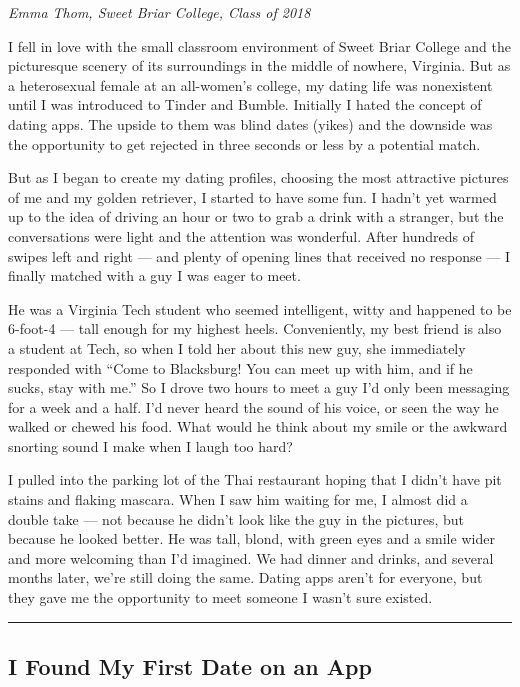 \emph{Emma Thom, Sweet Briar College, Class of 2018}

I fell in love with the small classroom environment of Sweet Briar
College and the picturesque scenery of its surroundings in the middle of
nowhere, Virginia. But as a heterosexual female at an all-women's
college, my dating life was nonexistent until I was introduced to Tinder
and Bumble. Initially I hated the concept of dating apps. The upside to
them was blind dates (yikes) and the downside was the opportunity to get
rejected in three seconds or less by a potential match.

But as I began to create my dating profiles, choosing the most
attractive pictures of me and my golden retriever, I started to have
some fun. I hadn't yet warmed up to the idea of driving an hour or two
to grab a drink with a stranger, but the conversations were light and
the attention was wonderful. After hundreds of swipes left and right ---
and plenty of opening lines that received no response --- I finally
matched with a guy I was eager to meet.

He was a Virginia Tech student who seemed intelligent, witty and
happened to be 6-foot-4 --- tall enough for my highest heels.
Conveniently, my best friend is also a student at Tech, so when I told
her about this new guy, she immediately responded with ``Come to
Blacksburg! You can meet up with him, and if he sucks, stay with me.''
So I drove two hours to meet a guy I'd only been messaging for a week
and a half. I'd never heard the sound of his voice, or seen the way he
walked or chewed his food. What would he think about my smile or the
awkward snorting sound I make when I laugh too hard?

I pulled into the parking lot of the Thai restaurant hoping that I
didn't have pit stains and flaking mascara. When I saw him waiting for
me, I almost did a double take --- not because he didn't look like the
guy in the pictures, but because he looked better. He was tall, blond,
with green eyes and a smile wider and more welcoming than I'd imagined.
We had dinner and drinks, and several months later, we're still doing
the same. Dating apps aren't for everyone, but they gave me the
opportunity to meet someone I wasn't sure existed.

\begin{center}\rule{0.5\linewidth}{\linethickness}\end{center}

\hypertarget{i-found-my-first-date-on-an-app}{%
\subsection{I Found My First Date on an
App}\label{i-found-my-first-date-on-an-app}}

